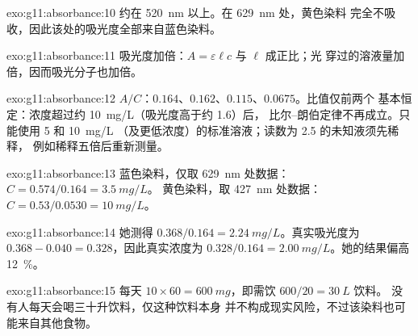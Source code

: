 \begin{solution}{exo:g11:absorbance:10}
约在 \qty{520}{nm} 以上。在 \qty{629}{nm} 处，黄色染料
完全不吸收，因此该处的吸光度全部来自蓝色染料。
\end{solution}

\begin{solution}{exo:g11:absorbance:11}
吸光度加倍：$A = \varepsilon \ell c$ 与 $\ell$ 成正比；光
穿过的溶液量加倍，因而吸光分子也加倍。
\end{solution}

\begin{solution}{exo:g11:absorbance:12}
$A/C$：$0.164$、$0.162$、$0.115$、$0.0675$。比值仅前两个
基本恒定：浓度超过约 \qty{10}{mg/L}（吸光度高于约 1.6）后，
比尔–朗伯定律不再成立。只能使用 5 和 \qty{10}{mg/L}
（及更低浓度）的标准溶液；读数为 2.5 的未知液须先稀释，
例如稀释五倍后重新测量。
\end{solution}

\begin{solution}{exo:g11:absorbance:13}
蓝色染料，仅取 \qty{629}{nm} 处数据：$C = 0.574 / 0.164 = \qty{3.5}{mg/L}$。
黄色染料，取 \qty{427}{nm} 处数据：$C = 0.53 / 0.0530 = \qty{10}{mg/L}$。
\end{solution}

\begin{solution}{exo:g11:absorbance:14}
她测得 $0.368 / 0.164 = \qty{2.24}{mg/L}$。真实吸光度为
$0.368 - 0.040 = 0.328$，因此真实浓度为
$0.328 / 0.164 = \qty{2.00}{mg/L}$。她的结果偏高 \qty{12}{\percent}。
\end{solution}

\begin{solution}{exo:g11:absorbance:15}
每天 $10 \times 60 = \qty{600}{mg}$，即需饮 $600 / 20 = \qty{30}{L}$ 饮料。
没有人每天会喝三十升饮料，仅这种饮料本身
并不构成现实风险，不过该染料也可能来自其他食物。
\end{solution}

